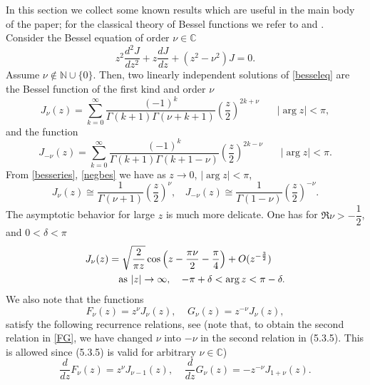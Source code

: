 \documentclass[11pt,letter]{amsart}
\def \G{\Gamma}
\numberwithin{equation}{section}
\newcommand{\C}{\mathbb{C}}
\numberwithin{equation}{section}
\begin{document}
In this section we collect some known results which are useful in the main body of the paper; for the classical theory of Bessel functions we refer to \cite{Wa} and \cite{Le}. 
Consider the Bessel equation of order $\nu\in \mathbb C$
\begin{equation}\label{besseleq}
z^2 \frac{d^2 J}{dz^2} + z \frac{dJ}{dz} + (z^2 - \nu^2)J = 0.
\end{equation}
Assume $\nu\notin\mathbb N\cup\{0\}$. Then, two linearly independent solutions of \eqref{besseleq} are the Bessel function of the first kind and order $\nu$ 
\begin{equation}\label{besseries}
J_\nu(z) = \sum_{k=0}^\infty \frac{(-1)^k}{\G(k+1) \G(\nu+k+1)} \left(\frac z2\right)^{2k+\nu}\ \ \ \ \ \ \ \ |\arg z|<\pi,
\end{equation}
and the function 
\begin{equation}\label{negbes}
J_{-\nu}(z)=\sum_{k=0}^\infty \frac{(-1)^k}{\G(k+1) \G(k+1-\nu)} \left(\frac z2\right)^{2k-\nu}\ \ \ \ \ \ \ \ |\arg z|<\pi.
\end{equation}
From \eqref{besseries}, \eqref{negbes} we have as $z\to 0$, $|\arg z|<\pi$,
\begin{equation}\label{Js}
J_{\nu}(z) \cong \frac 1{\G(\nu+1)} \left(\frac{z}{2}\right)^{\nu},\ \ \ \ J_{-\nu}(z) \cong \frac 1{\G(1-\nu)} \left(\frac{z}{2}\right)^{-\nu}.
\end{equation}
The asymptotic behavior for large $z$ is much more delicate. One has for $\Re\nu>-\dfrac12$, and $0<\delta<\pi$
\begin{align}\label{jnuinfty} J_\nu(z)&=\sqrt{\frac2{\pi
z}}\cos\left(z-\frac{\pi\nu}2-\frac\pi4\right)+
O(z^{-\frac32})\\
&\quad\text{as }|z|\to\infty,\quad-\pi+\delta<\arg z<\pi-\delta.
\notag
\end{align}
We also note that the functions
\begin{equation}\label{FG}
F_\nu(z) = z^\nu J_\nu(z),\ \ \ \ \ G_\nu(z) = z^{-\nu} J_{\nu}(z),
\end{equation}
satisfy the following recurrence relations, see \cite[(5.3.5), p.103]{Le} (note that, to obtain the second relation in \eqref{FG}, we have changed $\nu$ into $-\nu$ in the second relation in (5.3.5). This is allowed since (5.3.5) is valid for arbitrary $\nu\in \C$)
\begin{equation}\label{recu}
\frac{d}{dz} F_\nu(z) = z^\nu J_{\nu-1}(z),\ \ \ \ \ \frac{d}{dz} G_{\nu}(z) = - z^{-\nu} J_{1+\nu}(z).
\end{equation}
\end{document}
